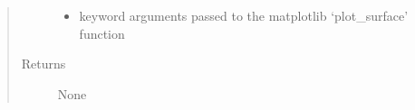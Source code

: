 \documentclass[letterpaper,10pt,english]{sphinxmanual}
\begin{document}
\begin{fulllineitems}
\begin{quote}
\begin{description}
\begin{itemize}
\item {} 
\sphinxAtStartPar
{} \textendash{} keyword arguments passed to the matplotlib ‘plot\_surface’ function

\end{itemize}

\item[{Returns}] \leavevmode
\sphinxAtStartPar
None

\end{description}\end{quote}

\end{fulllineitems}

\end{document}
